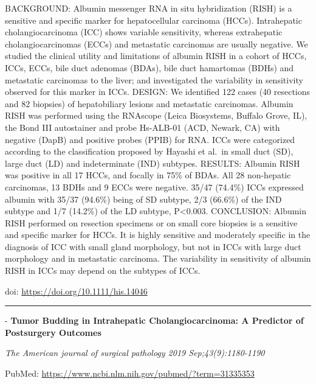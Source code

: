 \documentclass[
]{article}
\renewcommand{\linethickness}{0.05em}
\begin{document}
BACKGROUND: Albumin messenger RNA in situ hybridization (RISH) is a
sensitive and specific marker for hepatocellular carcinoma (HCCs).
Intrahepatic cholangiocarcinoma (ICC) shows variable sensitivity,
whereas extrahepatic cholangiocarcinomas (ECCs) and metastatic
carcinomas are usually negative. We studied the clinical utility and
limitations of albumin RISH in a cohort of HCCs, ICCs, ECCs, bile duct
adenomas (BDAs), bile duct hamartomas (BDHs) and metastatic carcinomas
to the liver; and investigated the variability in sensitivity observed
for this marker in ICCs. DESIGN: We identified 122 cases (40 resections
and 82 biopsies) of hepatobiliary lesions and metastatic carcinomas.
Albumin RISH was performed using the RNAscope (Leica Biosystems, Buffalo
Grove, IL), the Bond III autostainer and probe Hs-ALB-01 (ACD, Newark,
CA) with negative (DapB) and positive probes (PPIB) for RNA. ICCs were
categorized according to the classification proposed by Hayashi et
al.~in small duct (SD), large duct (LD) and indeterminate (IND)
subtypes. RESULTS: Albumin RISH was positive in all 17 HCCs, and focally
in 75\% of BDAs. All 28 non-hepatic carcinomas, 13 BDHs and 9 ECCs were
negative. 35/47 (74.4\%) ICCs expressed albumin with 35/37 (94.6\%)
being of SD subtype, 2/3 (66.6\%) of the IND subtype and 1/7 (14.2\%) of
the LD subtype, P\textless0.003. CONCLUSION: Albumin RISH performed on
resection specimens or on small core biopsies is a sensitive and
specific marker for HCCs. It is highly sensitive and moderately specific
in the diagnosis of ICC with small gland morphology, but not in ICCs
with large duct morphology and in metastatic carcinoma. The variability
in sensitivity of albumin RISH in ICCs may depend on the subtypes of
ICCs.

doi: \url{https://doi.org/10.1111/his.14046}

\begin{center}\rule{0.5\linewidth}{\linethickness}\end{center}

- \textbf{Tumor Budding in Intrahepatic Cholangiocarcinoma: A Predictor
of Postsurgery Outcomes}

\emph{The American journal of surgical pathology 2019
Sep;43(9):1180-1190}

PubMed: \url{https://www.ncbi.nlm.nih.gov/pubmed/?term=31335353}
\end{document}
